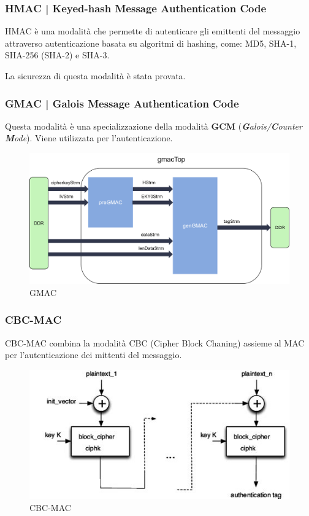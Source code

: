 \subsubsection{HMAC | Keyed-hash Message Authentication Code}

\textsf{\small HMAC è una modalità che permette di autenticare gli emittenti del messaggio attraverso autenticazione basata su algoritmi di hashing, come: MD5, SHA-1, SHA-256 (SHA-2) e SHA-3.}

\textsf{\small La sicurezza di questa modalità è stata provata.}

\subsubsection{GMAC | Galois Message Authentication Code}

\textsf{\small Questa modalità è una specializzazione della modalità \textbf{GCM} (\emph{\textbf{G}alois/\textbf{C}ounter \textbf{M}ode}). Viene utilizzata per l'autenticazione.}

\begin{figure}[H]
	\centering
	\includegraphics[width=.9\textwidth, height=.9\textheight, keepaspectratio]{./images/aes_modes/internal_structure_of_gmac} %
	\caption{GMAC}
	\label{fig:gmac}
\end{figure}

\subsubsection{CBC-MAC}

\textsf{\small CBC-MAC combina la modalità CBC (Cipher Block Chaning) assieme al MAC per l'autenticazione dei mittenti del messaggio.}

\begin{figure}[H]
	\centering
	\includegraphics[width=.9\textwidth, height=.9\textheight, keepaspectratio]{./images/aes_modes/cbc-mac}
	\caption{CBC-MAC}
	\label{fig:cbc-mac}
\end{figure}

